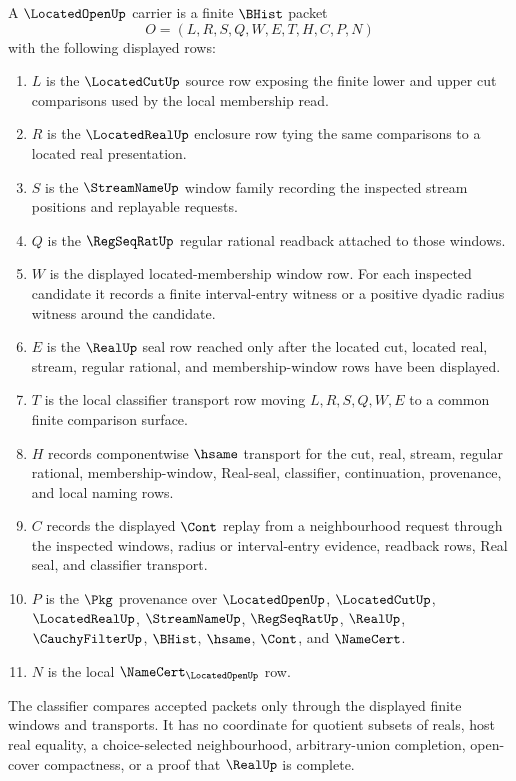 \begin{definition}
\label{def:located-open-carrier}
A $\LocatedOpenUp$ carrier is a finite $\BHist$ packet
$$
O=(L,R,S,Q,W,E,T,H,C,P,N)
$$
with the following displayed rows:
\begin{enumerate}
\item $L$ is the $\LocatedCutUp$ source row exposing the finite lower and upper
cut comparisons used by the local membership read.
\item $R$ is the $\LocatedRealUp$ enclosure row tying the same comparisons to a
located real presentation.
\item $S$ is the $\StreamNameUp$ window family recording the inspected stream
positions and replayable requests.
\item $Q$ is the $\RegSeqRatUp$ regular rational readback attached to those
windows.
\item $W$ is the displayed located-membership window row. For each inspected
candidate it records a finite interval-entry witness or a positive dyadic
radius witness around the candidate.
\item $E$ is the $\RealUp$ seal row reached only after the located cut, located
real, stream, regular rational, and membership-window rows have been displayed.
\item $T$ is the local classifier transport row moving $L,R,S,Q,W,E$ to a
common finite comparison surface.
\item $H$ records componentwise $\hsame$ transport for the cut, real, stream,
regular rational, membership-window, Real-seal, classifier, continuation,
provenance, and local naming rows.
\item $C$ records the displayed $\Cont$ replay from a neighbourhood request
through the inspected windows, radius or interval-entry evidence, readback rows,
Real seal, and classifier transport.
\item $P$ is the $\Pkg$ provenance over $\LocatedOpenUp$, $\LocatedCutUp$,
$\LocatedRealUp$, $\StreamNameUp$, $\RegSeqRatUp$, $\RealUp$,
$\CauchyFilterUp$, $\BHist$, $\hsame$, $\Cont$, and $\NameCert$.
\item $N$ is the local $\NameCert_{\LocatedOpenUp}$ row.
\end{enumerate}
The classifier compares accepted packets only through the displayed finite
windows and transports. It has no coordinate for quotient subsets of reals,
host real equality, a choice-selected neighbourhood, arbitrary-union
completion, open-cover compactness, or a proof that $\RealUp$ is complete.
\end{definition}

